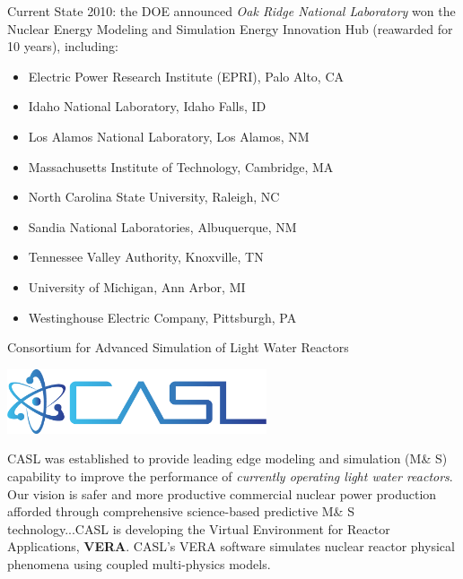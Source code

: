 \documentclass[xcolor=x11names,compress]{beamer}
\renewcommand{\(}{\begin{columns}}
\renewcommand{\)}{\end{columns}}
\newcommand{\<}[1]{\begin{column}{#1}}
\renewcommand{\>}{\end{column}}
\begin{document}
\begin{frame}{Current State}
2010: the DOE announced \emph{Oak Ridge National Laboratory} won the Nuclear Energy Modeling and Simulation Energy Innovation Hub (reawarded for 10 years), including:	
\begin{itemize}
\item Electric Power Research Institute (EPRI), Palo Alto, CA
\item Idaho National Laboratory, Idaho Falls, ID
\item Los Alamos National Laboratory, Los Alamos, NM
\item Massachusetts Institute of Technology, Cambridge, MA
\item North Carolina State University, Raleigh, NC
\item Sandia National Laboratories, Albuquerque, NM
\item Tennessee Valley Authority, Knoxville, TN
\item University of Michigan, Ann Arbor, MI
\item Westinghouse Electric Company, Pittsburgh, PA
\end{itemize}
\end{frame}

\begin{frame}{Consortium for Advanced Simulation of Light Water Reactors}
\begin{center}
\includegraphics[height=0.75in,clip]{CASL}
\end{center}
CASL was established to provide leading edge modeling and simulation (M\& S) capability to improve the performance of \textit{currently operating light water reactors}. Our vision is safer and more productive commercial nuclear power production afforded through comprehensive science-based predictive M\& S technology...CASL is developing the Virtual Environment for Reactor Applications, \textbf{VERA}. CASL's VERA software simulates nuclear reactor physical phenomena using coupled multi-physics models. 
\end{frame}
\end{document}
